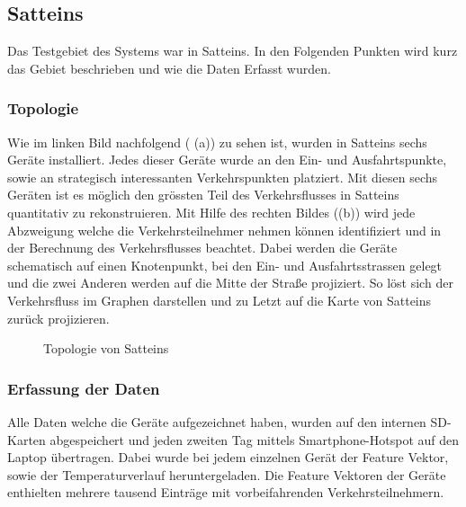 \subsection{Satteins}
Das Testgebiet des Systems war in Satteins. In den Folgenden Punkten wird kurz das Gebiet beschrieben und wie die Daten Erfasst wurden.
\subsubsection{Topologie}
Wie im linken Bild nachfolgend ( (a)) zu sehen ist, wurden in Satteins sechs Geräte installiert. Jedes dieser Geräte wurde an den Ein- und Ausfahrtspunkte, sowie an strategisch interessanten Verkehrspunkten platziert. Mit diesen sechs Geräten ist es möglich den grössten Teil des Verkehrsflusses in Satteins quantitativ zu rekonstruieren. Mit Hilfe des rechten Bildes ((b)) wird jede Abzweigung welche die Verkehrsteilnehmer nehmen können identifiziert und in der Berechnung des Verkehrsflusses beachtet. Dabei werden die Geräte schematisch auf einen Knotenpunkt, bei den Ein- und Ausfahrtsstrassen gelegt und die zwei Anderen werden auf die Mitte der Straße projiziert. So löst sich der Verkehrsfluss im Graphen darstellen und zu Letzt auf die Karte von Satteins zurück projizieren.

\begin{figure}[H]
  \centering
  \caption{Topologie von Satteins}
  \label{bSatteins}
\end{figure}

\subsubsection{Erfassung der Daten}
Alle Daten welche die Geräte aufgezeichnet haben, wurden auf den internen SD-Karten abgespeichert und jeden zweiten Tag mittels Smartphone-Hotspot auf den Laptop übertragen. Dabei wurde bei jedem einzelnen Gerät der Feature Vektor, sowie der Temperaturverlauf heruntergeladen. Die Feature Vektoren der Geräte enthielten mehrere tausend Einträge mit vorbeifahrenden Verkehrsteilnehmern.